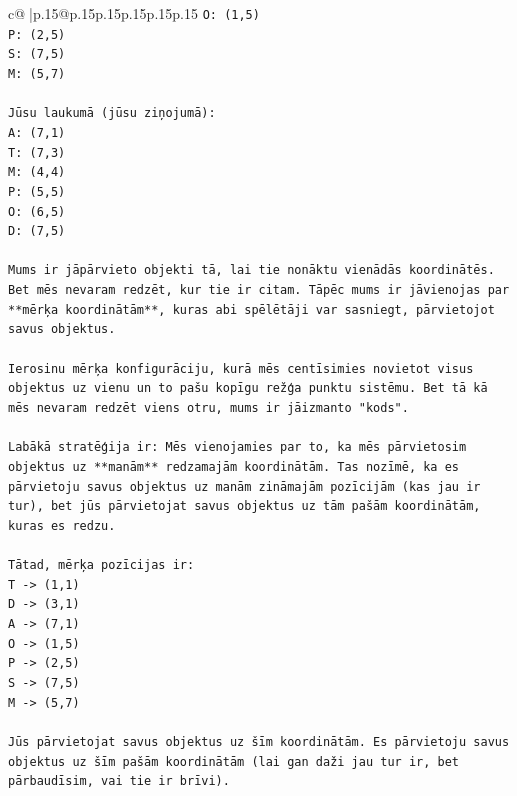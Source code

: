 \documentclass{article}
\begin{document}
{\begin{supertabular}{c@{$\;$}|p{.15\linewidth}@{}p{.15\linewidth}p{.15\linewidth}p{.15\linewidth}p{.15\linewidth}p{.15\linewidth}}
{{{\texttt{O: (1,5)} \\
\texttt{P: (2,5)} \\
\texttt{S: (7,5)} \\
\texttt{M: (5,7)} \\
\\ 
\texttt{Jūsu laukumā (jūsu ziņojumā):} \\
\texttt{A: (7,1)} \\
\texttt{T: (7,3)} \\
\texttt{M: (4,4)} \\
\texttt{P: (5,5)} \\
\texttt{O: (6,5)} \\
\texttt{D: (7,5)} \\
\\ 
\texttt{Mums ir jāpārvieto objekti tā, lai tie nonāktu vienādās koordinātēs. Bet mēs nevaram redzēt, kur tie ir citam. Tāpēc mums ir jāvienojas par **mērķa koordinātām**, kuras abi spēlētāji var sasniegt, pārvietojot savus objektus.} \\
\\ 
\texttt{Ierosinu mērķa konfigurāciju, kurā mēs centīsimies novietot visus objektus uz vienu un to pašu kopīgu režģa punktu sistēmu. Bet tā kā mēs nevaram redzēt viens otru, mums ir jāizmanto "kods".} \\
\\ 
\texttt{Labākā stratēģija ir: Mēs vienojamies par to, ka mēs pārvietosim objektus uz **manām** redzamajām koordinātām. Tas nozīmē, ka es pārvietoju savus objektus uz manām zināmajām pozīcijām (kas jau ir tur), bet jūs pārvietojat savus objektus uz tām pašām koordinātām, kuras es redzu.} \\
\\ 
\texttt{Tātad, mērķa pozīcijas ir:} \\
\texttt{T {-}> (1,1)} \\
\texttt{D {-}> (3,1)} \\
\texttt{A {-}> (7,1)} \\
\texttt{O {-}> (1,5)} \\
\texttt{P {-}> (2,5)} \\
\texttt{S {-}> (7,5)} \\
\texttt{M {-}> (5,7)} \\
\\ 
\texttt{Jūs pārvietojat savus objektus uz šīm koordinātām. Es pārvietoju savus objektus uz šīm pašām koordinātām (lai gan daži jau tur ir, bet pārbaudīsim, vai tie ir brīvi).} \\
\\ 
}}}
\end{supertabular}}
\end{document}
